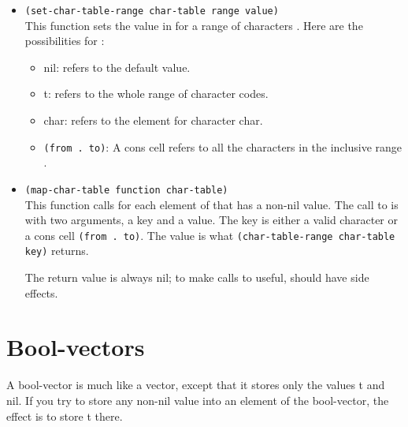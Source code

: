 \begin{itemize}
\item \lstinline|(set-char-table-range char-table range value)|\\
  This function sets the value in  for a range of characters .
  Here are the possibilities for :
  \begin{itemize}
  \item nil: refers to the default value.
  \item t: refers to the whole range of character codes.
  \item char: refers to the element for character char.
  \item \lstinline|(from . to)|: A cons cell refers to all the characters in the inclusive range \argument{[from to]}.
  \end{itemize}
\item \lstinline|(map-char-table function char-table)|\\
  This function calls  for each element of  that has a non-nil value.
  The call to  is with two arguments, a key and a value.
  The key is either a valid character or a cons cell \lstinline|(from . to)|.
  The value is what \lstinline|(char-table-range char-table key)| returns.

  The return value is always nil; to make calls to  useful,  should have side effects. 

\end{itemize}

\section{Bool-vectors}
\label{sec:bool-vectors}



A bool-vector is much like a vector, except that it stores only the values t and nil.
If you try to store any non-nil value into an element of the bool-vector, the effect is to store t there.


